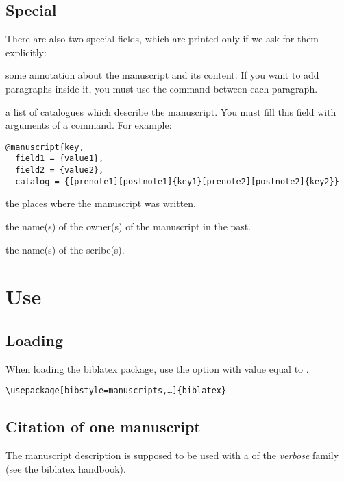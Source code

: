 \documentclass{ltxdockit}[2011/03/25]
\newcommand{\biblatex}{biblatex\xspace}
\begin{document}
\subsection{Special}\label{fields:special}
There are also two special fields, which are printed only if we ask for them explicitly:

\begin{fieldlist}
 some annotation about the manuscript and its content. If you want to add paragraphs inside it, you must use the  command between each paragraph.


 a list of catalogues which describe the manuscript. You must fill this field with arguments of a  command. For example:

\begin{verbatim}
@manuscript{key,
  field1 = {value1},
  field2 = {value2},
  catalog = {[prenote1][postnote1]{key1}[prenote2][postnote2]{key2}}
\end{verbatim}


 the places where the manuscript was written.

 the name(s) of the owner(s) of the manuscript in the past.

 the name(s) of the scribe(s).

\end{fieldlist}

\section{Use}
\subsection{Loading}

When loading the \biblatex package, use the option  with value equal to .

\begin{verbatim}
\usepackage[bibstyle=manuscripts,…]{biblatex}
\end{verbatim}

\subsection{Citation of one manuscript}

The manuscript description is supposed to be used with a  of the \emph{verbose} family (see the \biblatex handbook).
\end{document}
